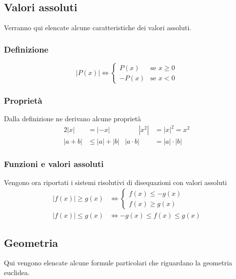 \subsection{Valori assoluti}
Verranno qui elencate alcune caratteristiche dei valori assoluti.

\subsubsection{Definizione}
\begin{equation*}
  \left\lvert P(x)\right\rvert \Leftrightarrow
  \begin{cases}
    P(x) &\text{se } x \geq 0\\
    -P(x) &\text{se } x < 0
  \end{cases}
\end{equation*}

\subsubsection{Proprietà}
Dalla definizione ne derivano alcune proprietà
\begin{alignat*}{2}
  \left\lvert x\right\rvert &= \left\lvert -x\right\rvert &\qquad 
  \left\lvert x^2\right\rvert&=\left\lvert x\right\rvert^2 = x^2\\
  \left\lvert a+b\right\rvert &\leq \left\lvert a\right\rvert+\left\lvert b\right\rvert & 
  \left\lvert a\cdot b\right\rvert&=\left\lvert a\right\rvert\cdot\left\lvert b\right\rvert
\end{alignat*}

\subsubsection{Funzioni e valori assoluti}
Vengono ora riportati i sistemi risolutivi di disequazioni con valori assoluti
\begin{align*}
  \left\lvert f(x)\right\rvert \geq g(x) &\Leftrightarrow 
  \begin{cases}
    f(x) \leq -g(x)\\
    f(x) \geq g(x)
  \end{cases}\\
  \left\lvert f(x)\right\rvert \leq g(x) &\Leftrightarrow -g(x)\leq f(x) \leq g(x)
\end{align*}

\subsection{Geometria}
Qui vengono elencate alcune formule particolari che riguardano la geometria euclidea.

